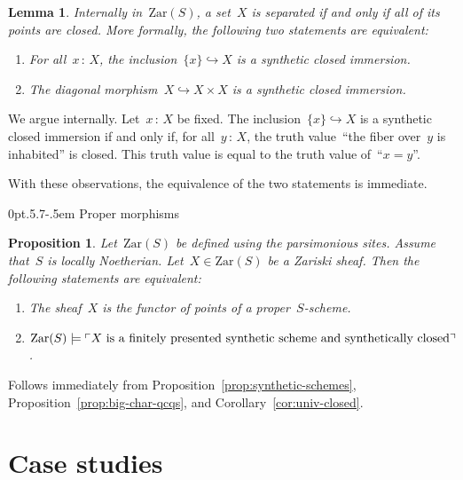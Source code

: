 \documentclass[10pt,reqno,a4paper]{amsbook}
\makeatletter
\theoremstyle{definition}
\theoremstyle{plain}
\newtheorem{prop}[defn]{Proposition}
\newtheorem{lemma}[defn]{Lemma}
\theoremstyle{remark}
\newcommand{\Zar}{\mathrm{Zar}}
\newcommand{\?}{\,{:}\,}
\renewcommand{\_}{\mathpunct{.}\,}
\newcommand{\speak}[1]{\ulcorner\text{\textnormal{#1}}\urcorner}
\renewenvironment{proof}[1][\proofname]{\par
  \pushQED{\qed}%
  \normalfont \topsep6\p@\@plus6\p@\relax
  \trivlist
  \item[\hskip\labelsep
        \itshape
    #1\@addpunct{.}]\ignorespaces
}{%
  \popQED\endtrivlist\@endpefalse
}
\def\subsection{\@startsection{subsection}{2}%
  {0pt}{.5\linespacing\@plus.7\linespacing}{-.5em}%
  {\normalfont\bfseries}}
\makeatother
\begin{document}
\begin{lemma}Internally in~$\Zar(S)$, a set~$X$ is separated if and only if all of
its points are closed. More formally, the following two statements are
equivalent:
\begin{enumerate}
\item For all~$x\?X$, the inclusion~$\{x\} \hookrightarrow X$ is a synthetic
closed immersion.
\item The diagonal morphism~$X \hookrightarrow X \times X$ is a synthetic
closed immersion.
\end{enumerate}
\end{lemma}

\begin{proof}We argue internally. Let~$x\?X$ be fixed. The inclusion~$\{x\}
\hookrightarrow X$ is a synthetic closed immersion if and only if, for
all~$y\?X$, the truth value~``the fiber over~$y$ is inhabited'' is closed. This
truth value is equal to the truth value of~``$x = y$''.

With these observations, the equivalence of the two statements is immediate.
\end{proof}


\subsection{Proper morphisms}
\label{sect:proper-morphisms}

\begin{prop}Let~$\Zar(S)$ be defined using the parsimonious sites. Assume
that~$S$ is locally Noetherian. Let~$X \in \Zar(S)$ be a Zariski sheaf. Then
the following statements are equivalent:
\begin{enumerate}
\item The sheaf~$X$ is the functor of points of a proper~$S$-scheme.
\item $\Zar(S) \models \speak{$X$ is a finitely presented synthetic scheme and
synthetically closed}$.
\end{enumerate}
\end{prop}

\begin{proof}Follows immediately from Proposition~\ref{prop:synthetic-schemes},
Proposition~\ref{prop:big-char-qcqs}, and Corollary~\ref{cor:univ-closed}.
\end{proof}


\section{Case studies}
\end{document}
